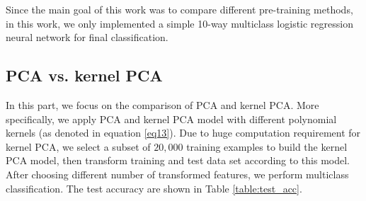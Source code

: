 \documentclass[tikz, multi,dvipsnames,svgnames,x11names]{article}
\begin{document}
Since the main goal of this work was to compare different pre-training methods, in this work, we only implemented a simple 10-way multiclass logistic regression neural network for final classification.

\subsection{PCA vs. kernel PCA}
\label{pca-kpca}

In this part, we focus on the comparison of PCA and kernel PCA. More specifically, we apply PCA and kernel PCA model with different polynomial kernels (as denoted in equation \ref{eq13}). Due to huge computation requirement for kernel PCA, we select a subset of $20,000$ training examples to build the kernel PCA model, then transform training and test data set according to this model. After choosing different number of transformed features, we perform multiclass classification. The test accuracy are shown in Table \ref{table:test_acc}.

\end{document}
